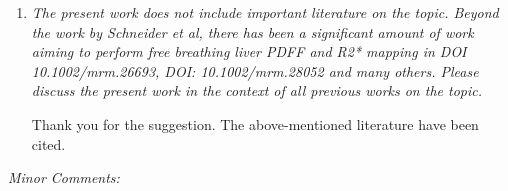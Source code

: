 \documentclass[a4paper,11pt]{report}
\begin{document}
\begin{enumerate}
	\item \textit{The present work does not include important literature on the topic. Beyond the work by Schneider et al, there has been a significant amount of work aiming to perform free breathing liver PDFF and R2* mapping in DOI 10.1002/mrm.26693, DOI: 10.1002/mrm.28052 and many others. Please discuss the present work in the context of all previous works on the topic.}

\hspace{1em} Thank you for the suggestion. The above-mentioned literature have been cited.

\hspace{1em} 

\end{enumerate}

\noindent \textit{Minor Comments:}
\end{document}
